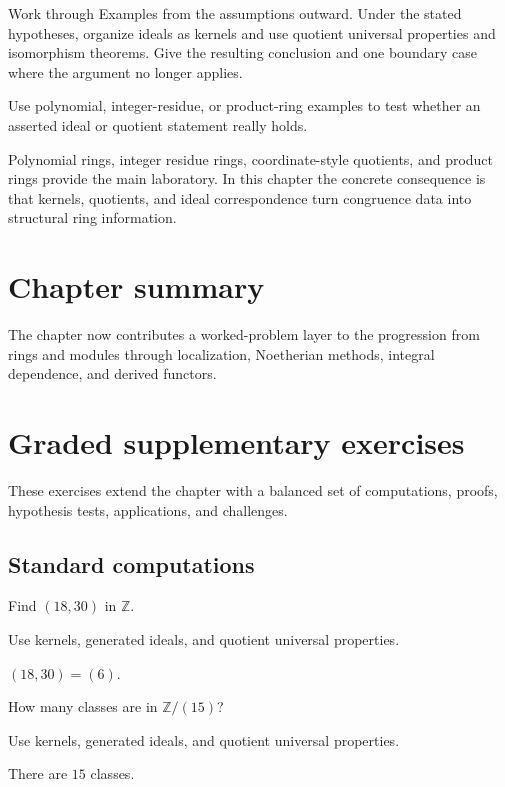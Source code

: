 \begin{exercise}\label{exr:v01-08}
Work through Examples from the assumptions outward. Under the stated hypotheses, organize ideals as kernels and use quotient universal properties and isomorphism theorems. Give the resulting conclusion and one boundary case where the argument no longer applies.
\end{exercise}
\begin{hint}
Use polynomial, integer-residue, or product-ring examples to test whether an asserted ideal or quotient statement really holds.
\end{hint}
\begin{solution}
Polynomial rings, integer residue rings, coordinate-style quotients, and product rings provide the main laboratory. In this chapter the concrete consequence is that kernels, quotients, and ideal correspondence turn congruence data into structural ring information.
\end{solution}

\section*{Chapter summary}
The chapter now contributes a worked-problem layer to the progression from rings and modules through localization, Noetherian methods, integral dependence, and derived functors.
\section{Graded supplementary exercises}
These exercises extend the chapter with a balanced set of computations, proofs, hypothesis tests, applications, and challenges.

\subsection*{Standard computations}

\begin{exercise}\label{exr:v01-expand-01}
Find $(18,30)$ in $\mathbb Z$.
\end{exercise}
\begin{hint}
Use kernels, generated ideals, and quotient universal properties.
\end{hint}
\begin{solution}
$(18,30)=(6)$.
\end{solution}

\begin{exercise}\label{exr:v01-expand-02}
How many classes are in $\mathbb Z/(15)$?
\end{exercise}
\begin{hint}
Use kernels, generated ideals, and quotient universal properties.
\end{hint}
\begin{solution}
There are $15$ classes.
\end{solution}

